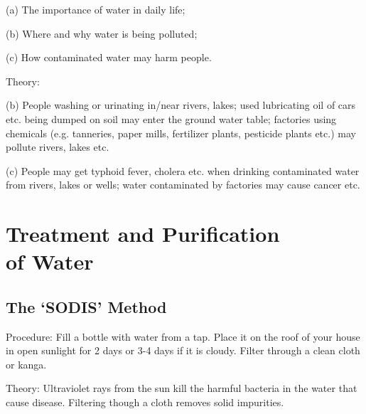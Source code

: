\begin{multicols}{2}
\begin{description*}
{(a) The importance of water in daily life;

(b) Where and why water is being polluted;

(c) How contaminated water may harm people.}
\item[Theory:]{(b) People washing or urinating in/near
rivers, lakes; used lubricating oil of cars etc.
being dumped on soil may enter the ground
water table; factories using chemicals (e.g.
tanneries, paper mills, fertilizer plants, pesticide
plants etc.) may pollute rivers, lakes etc.

(c) People may get typhoid fever, cholera etc.
when drinking contaminated water from rivers,
lakes or wells; water contaminated by factories
may cause cancer etc.}
\end{description*}


\section*{Treatment and Purification \hfill \\ of Water}


\subsection{The `SODIS' Method} %


\begin{description*}
\item[Procedure:]{Fill a bottle with water from a tap. Place it on the roof of your house in open sunlight for 2 days or 3-4 days if it is cloudy. Filter through a clean cloth or kanga.}
\item[Theory:]{Ultraviolet rays from the sun kill the harmful bacteria in the water that cause disease. Filtering though a cloth removes solid impurities.}
\end{description*}


\end{multicols}
